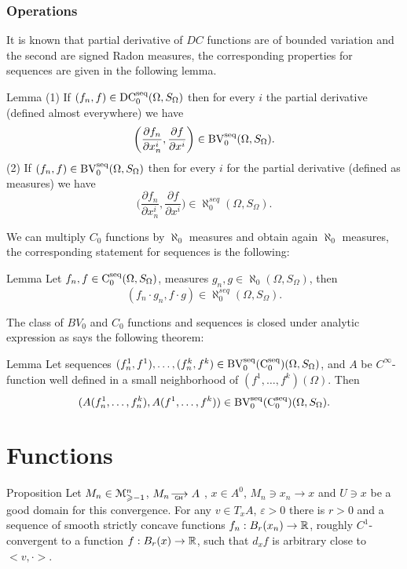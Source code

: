 \documentclass[a4paper,10pt]{article}
\begin{document}
\subsubsection{Operations}
It is known that
partial derivative of $DC$ functions are of bounded variation
and the second are signed Radon measures, 
the corresponding properties for  sequences 
are given in the following lemma.
\begin{thm}{Lemma}\label{thm-D}
(1) If     $( f_n, f)\in\operatorname{DC_0^{seq}}(\Omega,S_\Omega)$ 
then for every $i$ the partial derivative (defined almost everywhere)
we have
$$\biggl(\frac{\partial f_n}{\partial x_n^i}, \frac{\partial f}{\partial x^i}\biggr)\in\operatorname{BV_0^{seq}}(\Omega,S_\Omega).$$
(2) 
 If     $( f_n, f)\in\operatorname{BV_0^{seq}}(\Omega,S_\Omega)$ 
then for every $i$ for the partial derivative (defined as measures)
we have
$$\biggl(\frac{\partial f_n}{\partial x_n^i}, \frac{\partial f}{\partial x^i}\biggr)\in\aleph_0^{seq}(\Omega,S_\Omega).$$

\end{thm}
We can  multiply $C_0$ functions by $\aleph_0$ measures and
obtain again $\aleph_0$ measures, the corresponding statement
for sequences is the following:
\begin{thm}{Lemma}\label{thm-CM}
Let $f_n, f\in\operatorname{C_0^{seq}}(\Omega,S_\Omega)$,
measures $g_n, g\in\aleph_0(\Omega,S_\Omega)$,
then
$$(f_n\cdot g_n,f\cdot g)\in\aleph_0^{seq}(\Omega,S_\Omega).$$
\end{thm}
The class of $BV_0$ and $C_0$ functions and sequences is closed under analytic expression as
says the following theorem:
\begin{thm}{Lemma}\label{thm-A}
Let sequences $(f^1_n,f^1),\dots,(f^k_n, f^k) \in \operatorname{BV_0^{seq}(C_0^{seq})}(\Omega,S_\Omega)$,
and $A$ be  $C^\infty$-function well defined in a small neighborhood of
$(f^1,\dots,f^k)(\Omega)$.
Then $$(A(f^1_n,\dots,f^k_n), A(f^1,\dots,f^k))\in\operatorname{BV_0^{seq}(C_0^{seq})}(\Omega,S_\Omega).$$
\end{thm}


\section{ Functions }
 \begin{thm}{Proposition}\label{NiceFunctions}
 Let   
	$M_n\in\mathcal M_{\geqslant -1}^n$,
	$M_n\GHto A$ , $ x\in A^0$, $M_n\ni x_n\to x$
	and $U\ni x$
	be a good domain for this convergence.
 For any
  $v\in T_xA$,
 $\varepsilon>0$
 there is  $r>0$
 and a
  sequence of smooth strictly concave functions
 $f_n: B_r(x_n)\to \mathbb{R}$, roughly $C^1$-convergent to a function 
 $ f:B_r(x)\to\mathbb{R}$,
such that $d_xf$  is arbitrary close to $ <v,\cdot>$.
 \end{thm}
  
\end{document}
